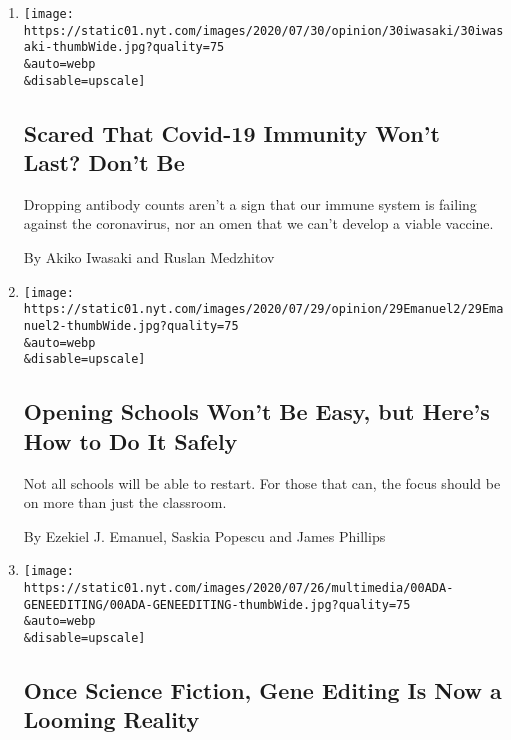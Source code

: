 \begin{enumerate}
\def\labelenumi{\arabic{enumi}.}
\item
  \href{/2020/07/31/opinion/coronavirus-antibodies-immunity.html}{}

  \texttt{[image: https://static01.nyt.com/images/2020/07/30/opinion/30iwasaki/30iwasaki-thumbWide.jpg?quality=75\\\&auto=webp\\\&disable=upscale]}

  \hypertarget{scared-that-covid-19-immunity-wont-last-dont-be}{%
  \subsection{Scared That Covid-19 Immunity Won't Last? Don't
  Be}\label{scared-that-covid-19-immunity-wont-last-dont-be}}

  Dropping antibody counts aren't a sign that our immune system is
  failing against the coronavirus, nor an omen that we can't develop a
  viable vaccine.

  By Akiko Iwasaki and Ruslan Medzhitov
\item
  \href{/2020/07/29/opinion/coronavirus-schools-reopen.html}{}

  \texttt{[image: https://static01.nyt.com/images/2020/07/29/opinion/29Emanuel2/29Emanuel2-thumbWide.jpg?quality=75\\\&auto=webp\\\&disable=upscale]}

  \hypertarget{opening-schools-wont-be-easy-but-heres-how-to-do-it-safely}{%
  \subsection{Opening Schools Won't Be Easy, but Here's How to Do It
  Safely}\label{opening-schools-wont-be-easy-but-heres-how-to-do-it-safely}}

  Not all schools will be able to restart. For those that can, the focus
  should be on more than just the classroom.

  By Ezekiel J. Emanuel, Saskia Popescu and James Phillips
\item
  \href{/2020/07/22/style/crispr-gene-editing-ethics.html}{}

  \texttt{[image: https://static01.nyt.com/images/2020/07/26/multimedia/00ADA-GENEEDITING/00ADA-GENEEDITING-thumbWide.jpg?quality=75\\\&auto=webp\\\&disable=upscale]}

  \hypertarget{once-science-fiction-gene-editing-is-now-a-looming-reality}{%
  \subsection{Once Science Fiction, Gene Editing Is Now a Looming
  Reality}\label{once-science-fiction-gene-editing-is-now-a-looming-reality}}


\end{enumerate}
